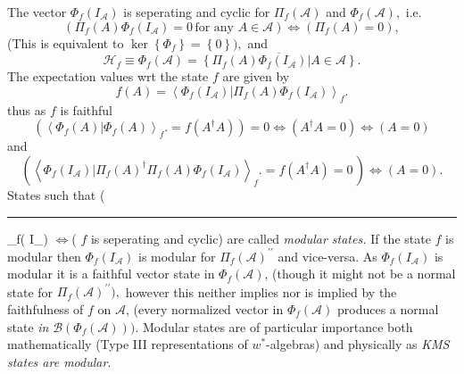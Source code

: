 \documentclass[aps,preprint]{revtex4}%
\providecommand{\U}[1]{\protect\rule{.1in}{.1in}}
\begin{document}
The vector $\Phi_{f}\left(  I_{\mathcal{A}}\right)  $ is seperating and cyclic
for $\Pi_{f}\left(  \mathcal{A}\right)  $ and $\Phi_{f}\left(  \mathcal{A}%
\right)  ,$ i.e.
\begin{equation}
\left(  \Pi_{f}\left(  A\right)  \Phi_{f}\left(  I_{\mathcal{A}}\right)
=0\,\text{for any }A\in\mathcal{A}\right)  \Leftrightarrow\left(  \Pi
_{f}\left(  A\right)  =0\right)  ,
\end{equation}
(This is equivalent to $\ker\left\{  \Phi_{f}\right\}  =\left\{  0\right\}
),$ and
\begin{equation}
\mathcal{H}_{f}\equiv\Phi_{f}\left(  \mathcal{A}\right)  =\overline{\left\{
\left.  \Pi_{f}\left(  A\right)  \Phi_{f}\left(  I_{\mathcal{A}}\right)
\right\vert A\in\mathcal{A}\right\}  }.
\end{equation}
The expectation values wrt the state $f$ are given by
\begin{equation}
f\left(  A\right)  =\left\langle \left.  \Phi_{f}\left(  I_{\mathcal{A}%
}\right)  \right\vert \Pi_{f}\left(  A\right)  \Phi_{f}\left(  I_{\mathcal{A}%
}\right)  \right\rangle _{f}.
\end{equation}
thus as $f$ is faithful
\begin{equation}
\left(  \left\langle \left.  \Phi_{f}\left(  A\right)  \right\vert \Phi
_{f}\left(  A\right)  \right\rangle _{f}.=f\left(  A^{\dagger}A\right)
\right)  =0\Leftrightarrow\left(  A^{\dagger}A=0\right)  \Leftrightarrow
\left(  A=0\right)
\end{equation}
and
\begin{equation}
\left(  \left\langle \left.  \Phi_{f}\left(  I_{\mathcal{A}}\right)
\right\vert \Pi_{f}\left(  A\right)  ^{\dagger}\Pi_{f}\left(  A\right)
\Phi_{f}\left(  I_{\mathcal{A}}\right)  \right\rangle _{f}.=f\left(
A^{\dagger}A\right)  =0\,\right)  \Leftrightarrow\left(  A=0\right)  .
\end{equation}
States such that (\U{e308}_f\left(  I_\right)   $\Leftrightarrow$( $f$ is seperating and cyclic) are called
\emph{modular states. }If the state\emph{ }$f$ is modular then $\Phi
_{f}\left(  I_{\mathcal{A}}\right)  $ is modular for $\Pi_{f}\left(
\mathcal{A}\right)  ^{\prime\prime}$ and vice-versa$.$ As $\Phi_{f}\left(
I_{\mathcal{A}}\right)  $ is modular it is a faithful vector state in
$\Phi_{f}\left(  \mathcal{A}\right)  $, (though it might not be a normal state
for $\Pi_{f}\left(  \mathcal{A}\right)  ^{\prime\prime}),$ however this
neither implies nor is implied by the faithfulness of $f$ on $\mathcal{A}$,
(every normalized vector in $\Phi_{f}\left(  \mathcal{A}\right)  $ produces a
normal state \emph{in} $\mathcal{B}\left(  \Phi_{f}\left(  \mathcal{A}\right)
\right)  ).$ Modular states are of particular importance both mathematically
(Type III representations of $w^{\ast}$-algebras) and physically as \emph{KMS
states are modular}.
\end{document}
